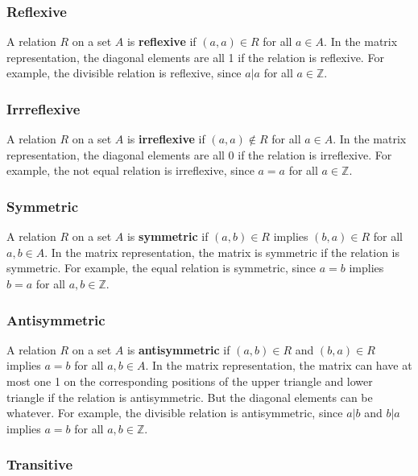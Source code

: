 \documentclass[a4paper,12pt]{article}
\begin{document}
\subsubsection{Reflexive}

A relation $R$ on a set $A$ is \textbf{reflexive} if $(a,a) \in R$ for all $a \in A$.
In the matrix representation, the diagonal elements are all 1 if the relation is reflexive.
For example, the divisible relation is reflexive, since $a|a$ for all $a \in \mathbb{Z}$.

\subsubsection{Irrreflexive}

A relation $R$ on a set $A$ is \textbf{irreflexive} if $(a,a) \notin R$ for all $a \in A$.
In the matrix representation, the diagonal elements are all 0 if the relation is irreflexive.
For example, the not equal relation is irreflexive, since $a = a$ for all $a \in \mathbb{Z}$.

\subsubsection{Symmetric}

A relation $R$ on a set $A$ is \textbf{symmetric} if $(a,b) \in R$ implies $(b,a) \in R$ for all $a,b \in A$.
In the matrix representation, the matrix is symmetric if the relation is symmetric.
For example, the equal relation is symmetric, since $a = b$ implies $b = a$ for all $a,b \in \mathbb{Z}$.

\subsubsection{Antisymmetric}

A relation $R$ on a set $A$ is \textbf{antisymmetric} if $(a,b) \in R$ and $(b,a) \in R$ implies $a = b$ for all $a,b \in A$.
In the matrix representation, the matrix can have at most one 1 on the corresponding positions of the upper triangle and lower triangle if the relation is antisymmetric.
But the diagonal elements can be whatever.
For example, the divisible relation is antisymmetric, since $a|b$ and $b|a$ implies $a = b$ for all $a,b \in \mathbb{Z}$.

\subsubsection{Transitive}
\end{document}
